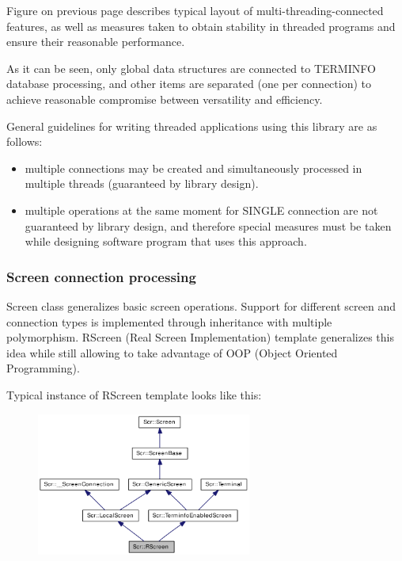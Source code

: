   \pagebreak

  Figure on previous page describes typical layout of
  multi-threading-connected features, as well as measures taken to
  obtain stability in threaded programs and ensure their reasonable
  performance.

  As it can be seen, only global data structures are connected to
  TERMINFO database processing, and other items are separated (one per
  connection) to achieve reasonable compromise between versatility and
  efficiency.

  \important
  General guidelines for writing threaded applications using this
  library are as follows:
  
  \begin{itemize}
  \item multiple connections may be created and simultaneously
    processed in multiple threads (guaranteed by library design).
  \item multiple operations at the same moment for SINGLE connection
    are not guaranteed by library design, and therefore special
    measures must be taken while designing software program that uses
    this approach. 
  \end{itemize}
  

\subsubsection{Screen connection processing}
  Screen class generalizes basic screen operations. Support for
  different screen and connection types is implemented through
  inheritance with  multiple polymorphism. RScreen (Real Screen
  Implementation) template generalizes this idea while still allowing
  to take advantage of OOP (Object Oriented Programming).

  Typical instance of RScreen template looks like this:

  \begin{figure}[H]
  \begin{center}
  \leavevmode\includegraphics[width=200pt]{graphics/classScr_1_1RScreen__inherit__graph}
  \end{center}
  \end{figure}

